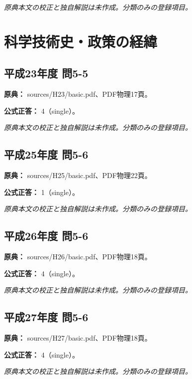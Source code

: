 \par\textit{原典本文の校正と独自解説は未作成。分類のみの登録項目。}

\section{科学技術史・政策の経緯}

\subsection{平成23年度 問5-5}
\label{q:h23-reg-basic-5-5}

\noindent\textbf{原典：} sources/H23/basic.pdf、PDF物理17頁。

\textbf{公式正答：} 4（single）。

\par\textit{原典本文の校正と独自解説は未作成。分類のみの登録項目。}

\subsection{平成25年度 問5-6}
\label{q:h25-reg-basic-5-6}

\noindent\textbf{原典：} sources/H25/basic.pdf、PDF物理22頁。

\textbf{公式正答：} 1（single）。

\par\textit{原典本文の校正と独自解説は未作成。分類のみの登録項目。}

\subsection{平成26年度 問5-6}
\label{q:h26-reg-basic-5-6}

\noindent\textbf{原典：} sources/H26/basic.pdf、PDF物理18頁。

\textbf{公式正答：} 4（single）。

\par\textit{原典本文の校正と独自解説は未作成。分類のみの登録項目。}

\subsection{平成27年度 問5-6}
\label{q:h27-reg-basic-5-6}

\noindent\textbf{原典：} sources/H27/basic.pdf、PDF物理18頁。

\textbf{公式正答：} 4（single）。

\par\textit{原典本文の校正と独自解説は未作成。分類のみの登録項目。}

